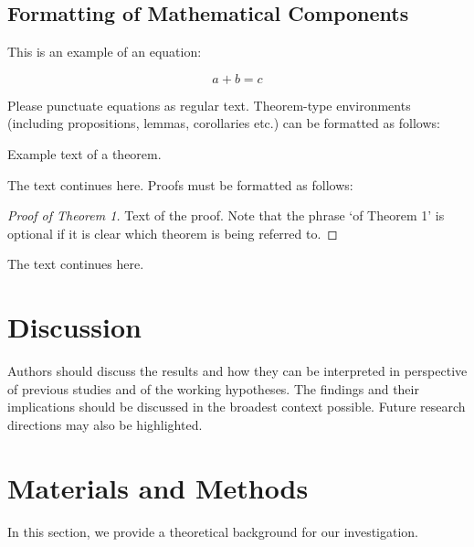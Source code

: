 \documentclass[applsci,article,submit,moreauthors,pdftex]{Definitions/mdpi}
\begin{document}
\subsection{Formatting of Mathematical Components}

This is an example of an equation:

\begin{equation}
a + b = c
\end{equation}

Please punctuate equations as regular text. Theorem-type environments (including propositions, lemmas, corollaries etc.) can be formatted as follows:
\begin{Theorem}
Example text of a theorem.
\end{Theorem}

The text continues here. Proofs must be formatted as follows:

\begin{proof}[Proof of Theorem 1]
Text of the proof. Note that the phrase `of Theorem 1' is optional if it is clear which theorem is being referred to.
\end{proof}
The text continues here.

\section{Discussion}

Authors should discuss the results and how they can be interpreted in perspective of previous studies and of the working hypotheses. The findings and their implications should be discussed in the broadest context possible. Future research directions may also be highlighted.

\section{Materials and Methods}

In this section, we provide a theoretical background for our investigation.
\end{document}
